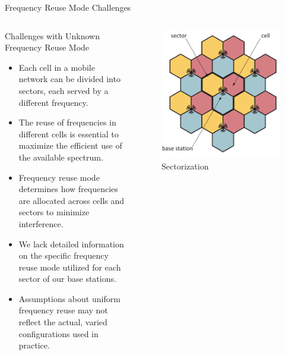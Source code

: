 \begin{frame}{Frequency Reuse Mode Challenges}
    \begin{columns}
        \begin{column}{0.55\textwidth}
            \begin{block}{Challenges with Unknown Frequency Reuse Mode}
                    \begin{itemize}
                        \item Each cell in a mobile network can be divided into sectors, each served by a different frequency.
                        \item The reuse of frequencies in different cells is essential to maximize the efficient use of the available spectrum.
                        \item Frequency reuse mode determines how frequencies are allocated across cells and sectors to minimize interference.
                        \item We lack detailed information on the specific frequency reuse mode utilized for each sector of our base stations.
                        \item Assumptions about uniform frequency reuse may not reflect the actual, varied configurations used in practice.
                    \end{itemize}
            \end{block}
        \end{column}
        \begin{column}{0.6\textwidth}
            \begin{figure}
                \includegraphics[height=0.4\paperheight]{images/Altair/Sectorization.png}
                \caption{\label{fig:ill_HDBScan_4} Sectorization}
            \end{figure}
        \end{column}
    \end{columns}
\end{frame}
